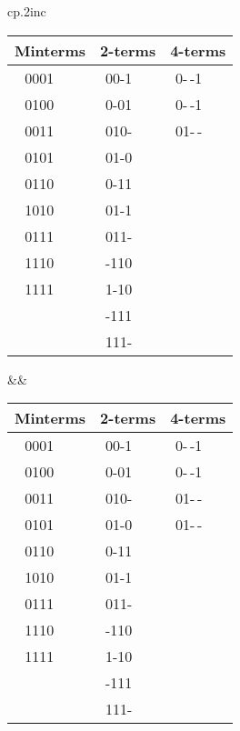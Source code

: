 \vspace{.1in}

\begin{tabular}{cp{.2in}c}
\begin{tabular}{cp{.1in}cp{.1in}cp{.1in}}
\multicolumn{2}{c}{Minterms} & \multicolumn{2}{c}{2-terms}  & \multicolumn{2}{c}{4-terms} \\\hline
0001 & \checkmark & 00-1 & \checkmark & 0-$\,$-1 &  \\
0100 & \checkmark & 0-01 & \checkmark & 0-$\,$-1 &  \\\cline{1-2}
0011 & \checkmark & \textcolor[rgb]{1.00,0.00,0.00}{010-} & \checkmark & \textcolor[rgb]{1.00,0.00,0.00}{01-$\,$-} &  \\
0101 & \checkmark & 01-0 &            &  &  \\\cline{3-4}
0110 & \checkmark & 0-11 & \checkmark &  &  \\
1010 & \checkmark & 01-1 & \checkmark &  &  \\\cline{1-2}
0111 & \checkmark & \textcolor[rgb]{1.00,0.00,0.00}{011-} & \checkmark &  &  \\
1110 & \checkmark & -110 &            &  &  \\\cline{1-2}
1111 & \checkmark & 1-10 &            &  &  \\\cline{3-4}
     &            & -111 &            &  &  \\
     &            & 111- &            &  &  \\
\end{tabular}
&&
\begin{tabular}{cp{.1in}cp{.1in}cp{.1in}}
\multicolumn{2}{c}{Minterms} & \multicolumn{2}{c}{2-terms}  & \multicolumn{2}{c}{4-terms} \\\hline
0001 & \checkmark & 00-1 & \checkmark & 0-$\,$-1 &  \\
0100 & \checkmark & 0-01 & \checkmark & 0-$\,$-1 &  \\\cline{1-2}
0011 & \checkmark & 010- & \checkmark & 01-$\,$- &  \\
0101 & \checkmark & \textcolor[rgb]{1.00,0.00,0.00}{01-0} & \checkmark & \textcolor[rgb]{1.00,0.00,0.00}{01-$\,$-} &  \\\cline{3-4}
0110 & \checkmark & 0-11 & \checkmark &  &  \\
1010 & \checkmark & \textcolor[rgb]{1.00,0.00,0.00}{01-1} & \checkmark &  &  \\\cline{1-2}
0111 & \checkmark & 011- & \checkmark &  &  \\
1110 & \checkmark & -110 &            &  &  \\\cline{1-2}
1111 & \checkmark & 1-10 &            &  &  \\\cline{3-4}
     &            & -111 &            &  &  \\
     &            & 111- &            &  &  \\
\end{tabular}\\
\end{tabular}

